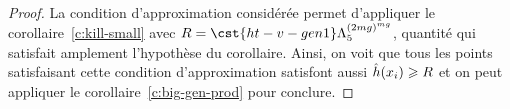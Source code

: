 \begin{proof}
  La condition d'approximation considérée permet d'appliquer le
  corollaire~\vref{c:kill-small} avec
  \( R = \cst{ht-v-gen1} \Lambda_5^{(2mg)^{mg}} \),
  quantité qui satisfait amplement l'hypothèse du corollaire. Ainsi, on voit
  que tous les points satisfaisant cette condition d'approximation satisfont
  aussi \( \hat h (x_i) \geqslant R \) et on peut appliquer le
  corollaire~\vref{c:big-gen-prod} pour conclure.
\end{proof}


\cleardoublepage
\endinput

